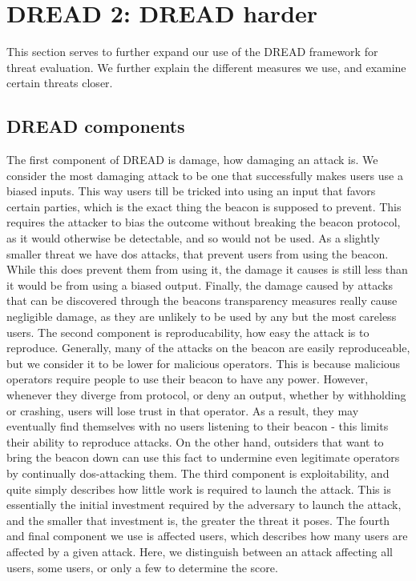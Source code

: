 \section{DREAD 2: DREAD harder}\label{app:dread}
This section serves to further expand our use of the DREAD framework for threat evaluation. We further explain the different measures we use, and examine certain threats closer.

\subsection{DREAD components}
The first component of DREAD is damage, how damaging an attack is. We consider the most damaging attack to be one that successfully makes users use a biased inputs. This way users till be tricked into using an input that favors certain parties, which is the exact thing the beacon is supposed to prevent. This requires the attacker to bias the outcome without breaking the beacon protocol, as it would otherwise be detectable, and so would not be used.
As a slightly smaller threat we have \acrshort{dos} attacks, that prevent users from using the beacon. While this does prevent them from using it, the damage it causes is still less than it would be from using a biased output.
Finally, the damage caused by attacks that can be discovered through the beacons transparency measures really cause negligible damage, as they are unlikely to be used by any but the most careless users.
The second component is reproducability, how easy the attack is to reproduce. Generally, many of the attacks on the beacon are easily reproduceable, but we consider it to be lower for malicious operators. This is because malicious operators require people to use their beacon to have any power. However, whenever they diverge from protocol, or deny an output, whether by withholding or crashing, users will lose trust in that operator. As a result, they may eventually find themselves with no users listening to their beacon - this limits their ability to reproduce attacks.
On the other hand, outsiders that want to bring the beacon down can use this fact to undermine even legitimate operators by continually \acrshort{dos}-attacking them.
The third component is exploitability, and quite simply describes how little work is required to launch the attack. This is essentially the initial investment required by the adversary to launch the attack, and the smaller that investment is, the greater the threat it poses.
The fourth and final component we use is affected users, which describes how many users are affected by a given attack. Here, we distinguish between an attack affecting all users, some users, or only a few to determine the score.

